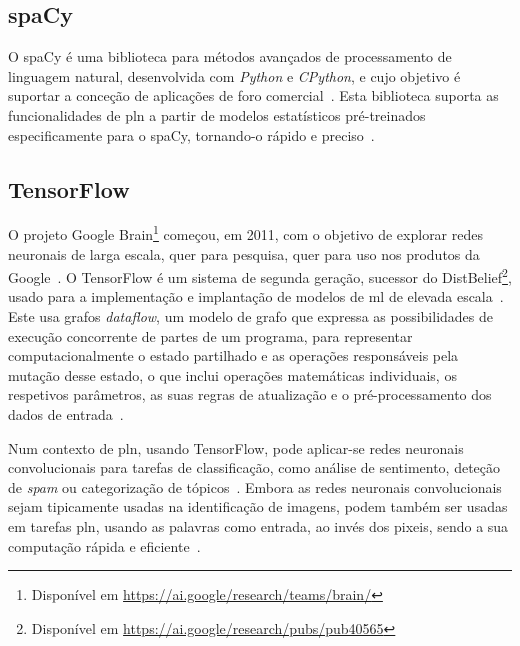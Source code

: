 \subsection{spaCy}
O spaCy é uma biblioteca para métodos avançados de processamento de linguagem natural, desenvolvida com \textit{Python} e \textit{CPython}, e cujo objetivo é suportar a conceção de aplicações de foro comercial~\parencite{choosing_nlp_library}. Esta biblioteca suporta as funcionalidades de \gls{pln} a partir de modelos estatísticos pré-treinados especificamente para o spaCy, tornando-o rápido e preciso~\parencite{spacy_usage}.

\subsection{TensorFlow}
O projeto Google Brain\footnote{Disponível em \url{https://ai.google/research/teams/brain/}} começou, em 2011, com o objetivo de explorar redes neuronais de larga escala, quer para pesquisa, quer para uso nos produtos da Google~\parencite{tensorflow_largescale_machine_learning_distributed_systems}. O TensorFlow é um sistema de segunda geração, sucessor do DistBelief\footnote{Disponível em \url{https://ai.google/research/pubs/pub40565}}, usado para a implementação e implantação de modelos de \gls{ml} de elevada escala~\parencite{tensorflow_largescale_machine_learning_distributed_systems}. Este usa grafos \textit{dataflow}, um modelo de grafo que expressa as possibilidades de execução concorrente de partes de um programa, para representar computacionalmente o estado partilhado e as operações responsáveis pela mutação desse estado, o que inclui operações matemáticas individuais, os respetivos parâmetros, as suas regras de atualização e o pré-processamento dos dados de entrada~\parencite{data_flow_graphs_encyclopedia_parellel_computing, tensorflow_system_largescale_machine_learning}.

Num contexto de \gls{pln}, usando TensorFlow, pode aplicar-se redes neuronais convolucionais para tarefas de classificação, como análise de sentimento, deteção de \textit{spam} ou categorização de tópicos~\parencite{understanding_convolution_neural_networks_nlp}. Embora as redes neuronais convolucionais sejam tipicamente usadas na identificação de imagens, podem também ser usadas em tarefas \gls{pln}, usando as palavras como entrada, ao invés dos pixeis, sendo a sua computação rápida e eficiente~\parencite{understanding_convolution_neural_networks_nlp}.

